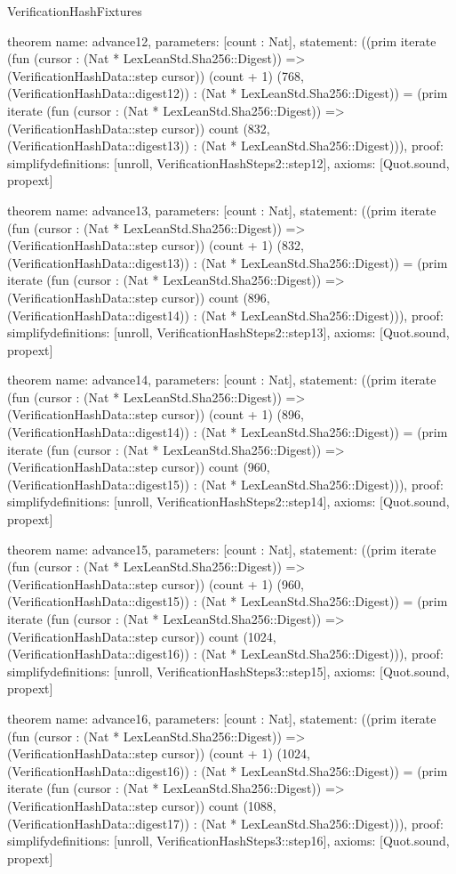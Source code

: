 \begin{lexlean}{VerificationHashFixtures}
\begin{semanticmodule}
theorem{
  name: advance12,
  parameters: [count : Nat],
  statement: ((prim iterate (fun (cursor : (Nat * LexLeanStd.Sha256::Digest)) => (VerificationHashData::step cursor)) (count + 1) (768, (VerificationHashData::digest12)) : (Nat * LexLeanStd.Sha256::Digest)) = (prim iterate (fun (cursor : (Nat * LexLeanStd.Sha256::Digest)) => (VerificationHashData::step cursor)) count (832, (VerificationHashData::digest13)) : (Nat * LexLeanStd.Sha256::Digest))),
  proof: simplify{definitions: [unroll, VerificationHashSteps2::step12]},
  axioms: [Quot.sound, propext]
}

theorem{
  name: advance13,
  parameters: [count : Nat],
  statement: ((prim iterate (fun (cursor : (Nat * LexLeanStd.Sha256::Digest)) => (VerificationHashData::step cursor)) (count + 1) (832, (VerificationHashData::digest13)) : (Nat * LexLeanStd.Sha256::Digest)) = (prim iterate (fun (cursor : (Nat * LexLeanStd.Sha256::Digest)) => (VerificationHashData::step cursor)) count (896, (VerificationHashData::digest14)) : (Nat * LexLeanStd.Sha256::Digest))),
  proof: simplify{definitions: [unroll, VerificationHashSteps2::step13]},
  axioms: [Quot.sound, propext]
}

theorem{
  name: advance14,
  parameters: [count : Nat],
  statement: ((prim iterate (fun (cursor : (Nat * LexLeanStd.Sha256::Digest)) => (VerificationHashData::step cursor)) (count + 1) (896, (VerificationHashData::digest14)) : (Nat * LexLeanStd.Sha256::Digest)) = (prim iterate (fun (cursor : (Nat * LexLeanStd.Sha256::Digest)) => (VerificationHashData::step cursor)) count (960, (VerificationHashData::digest15)) : (Nat * LexLeanStd.Sha256::Digest))),
  proof: simplify{definitions: [unroll, VerificationHashSteps2::step14]},
  axioms: [Quot.sound, propext]
}

theorem{
  name: advance15,
  parameters: [count : Nat],
  statement: ((prim iterate (fun (cursor : (Nat * LexLeanStd.Sha256::Digest)) => (VerificationHashData::step cursor)) (count + 1) (960, (VerificationHashData::digest15)) : (Nat * LexLeanStd.Sha256::Digest)) = (prim iterate (fun (cursor : (Nat * LexLeanStd.Sha256::Digest)) => (VerificationHashData::step cursor)) count (1024, (VerificationHashData::digest16)) : (Nat * LexLeanStd.Sha256::Digest))),
  proof: simplify{definitions: [unroll, VerificationHashSteps3::step15]},
  axioms: [Quot.sound, propext]
}

theorem{
  name: advance16,
  parameters: [count : Nat],
  statement: ((prim iterate (fun (cursor : (Nat * LexLeanStd.Sha256::Digest)) => (VerificationHashData::step cursor)) (count + 1) (1024, (VerificationHashData::digest16)) : (Nat * LexLeanStd.Sha256::Digest)) = (prim iterate (fun (cursor : (Nat * LexLeanStd.Sha256::Digest)) => (VerificationHashData::step cursor)) count (1088, (VerificationHashData::digest17)) : (Nat * LexLeanStd.Sha256::Digest))),
  proof: simplify{definitions: [unroll, VerificationHashSteps3::step16]},
  axioms: [Quot.sound, propext]
}


\end{semanticmodule}
\end{lexlean}

